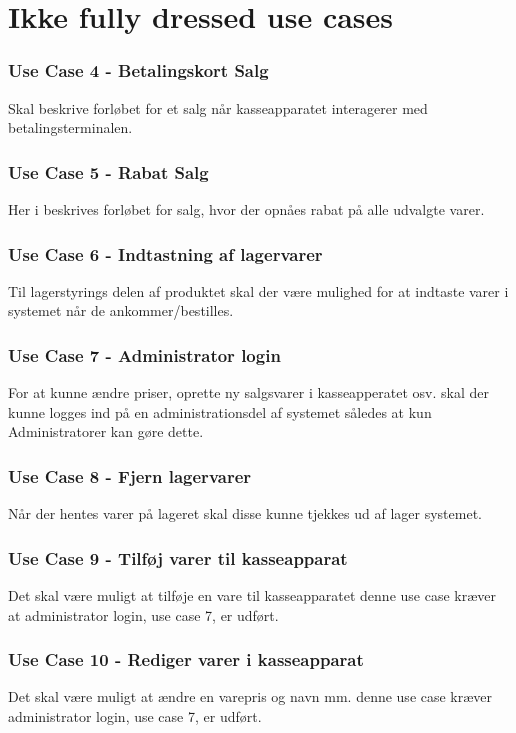 \section{Ikke fully dressed use cases}

\subsubsection*{Use Case 4 - Betalingskort Salg}
Skal beskrive forløbet for et salg når kasseapparatet interagerer med betalingsterminalen.

\subsubsection*{Use Case 5 - Rabat Salg}
Her i beskrives forløbet for salg, hvor der opnåes rabat på alle udvalgte varer.

\subsubsection*{Use Case 6 - Indtastning af lagervarer}
Til lagerstyrings delen af produktet skal der være mulighed for at indtaste varer i systemet når de ankommer/bestilles.

\subsubsection*{Use Case 7 - Administrator login}
For at kunne ændre priser, oprette ny salgsvarer i kasseapperatet osv. skal der kunne logges ind på en administrationsdel af systemet således at kun Administratorer kan gøre dette.

\subsubsection*{Use Case 8 - Fjern lagervarer}
Når der hentes varer på lageret skal disse kunne tjekkes ud af lager systemet.

\subsubsection*{Use Case 9 - Tilføj varer til kasseapparat}
Det skal være muligt at tilføje en vare til kasseapparatet denne use case kræver at administrator login, use case 7, er udført.

\subsubsection*{Use Case 10 - Rediger varer i kasseapparat}
Det skal være muligt at ændre en varepris og navn mm. denne use case kræver administrator login, use case 7, er udført.

